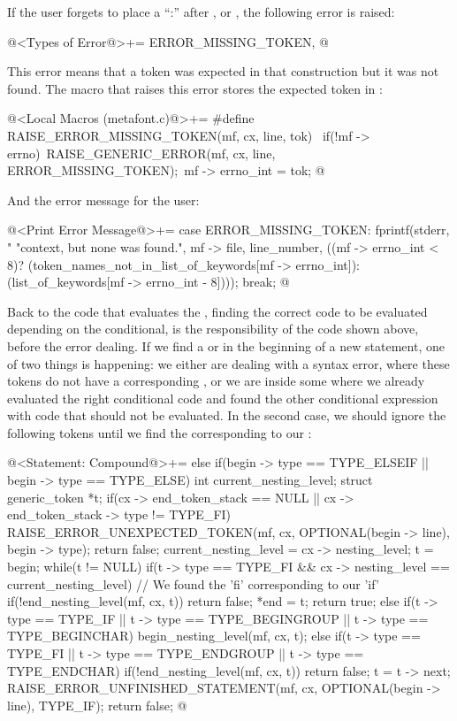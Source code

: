 {{{{{If the user forgets to place a ``:''
after ,  or , the
following error is raised:

\iniciocodigo
@<Types of Error@>+=
ERROR_MISSING_TOKEN,
@
\fimcodigo

This error means that a token was expected in that construction but it
was not found. The macro that raises this error stores the expected
token in :

\iniciocodigo
@<Local Macros (metafont.c)@>+=
#define RAISE_ERROR_MISSING_TOKEN(mf, cx, line, tok) {\
  if(!mf -> errno){\
    RAISE_GENERIC_ERROR(mf, cx, line, ERROR_MISSING_TOKEN);\
    mf -> errno_int = tok;}}
@
\fimcodigo

And the error message for the user:

\iniciocodigo
@<Print Error Message@>+=
case ERROR_MISSING_TOKEN:
  fprintf(stderr, "%
          "context, but none was found.", mf -> file, line_number,
          ((mf -> errno_int < 8)?
          (token_names_not_in_list_of_keywords[mf -> errno_int]):
          (list_of_keywords[mf -> errno_int - 8])));
  break;
@
\fimcodigo

Back to the code that evaluates the , finding the
correct code to be evaluated depending on the conditional, is the
responsibility of the code shown above, before the error dealing. If
we find a \monoespaco{elseif} or \monoespaco{else} in the beginning of
a new statement, one of two things is happening: we either are dealing
with a syntax error, where these tokens do not have a
corresponding \monoespaco{if}, or we are inside some \monoespaco{if}
where we already evaluated the right conditional code and found the
other conditional expression with code that should not be
evaluated. In the second case, we should ignore the following tokens
until we find the \monoespaco{fi} corresponding to
our \monoespaco{ìf}:

\iniciocodigo
@<Statement: Compound@>+=
else if(begin -> type == TYPE_ELSEIF || begin -> type == TYPE_ELSE){
  int current_nesting_level;
  struct generic_token *t;
  if(cx -> end_token_stack == NULL ||
     cx -> end_token_stack -> type != TYPE_FI){
    RAISE_ERROR_UNEXPECTED_TOKEN(mf, cx, OPTIONAL(begin -> line),
                                 begin -> type);
    return false;
  }
  current_nesting_level = cx -> nesting_level;
  t = begin;
  while(t != NULL){
    if(t -> type == TYPE_FI && cx -> nesting_level == current_nesting_level){
      // We found the 'fi' corresponding to our 'if'
      if(!end_nesting_level(mf, cx, t))
        return false;
      *end = t;
      return true;
    }
    else if(t -> type == TYPE_IF || t -> type == TYPE_BEGINGROUP ||
            t -> type == TYPE_BEGINCHAR)
      begin_nesting_level(mf, cx, t);
    else if(t -> type == TYPE_FI || t -> type == TYPE_ENDGROUP ||
            t -> type == TYPE_ENDCHAR)
      if(!end_nesting_level(mf, cx, t))
        return false;
    t = t -> next;
  }
  RAISE_ERROR_UNFINISHED_STATEMENT(mf, cx, OPTIONAL(begin -> line),
                                   TYPE_IF);
  return false;
}
@
\fimcodigo

}}}}}
